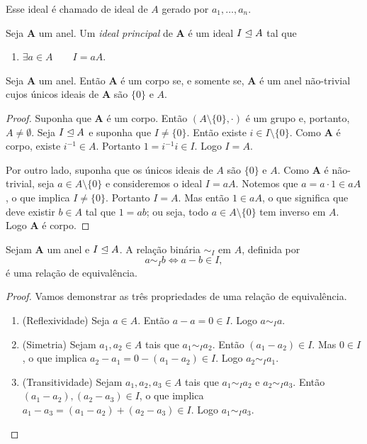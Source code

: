 	Esse ideal é chamado de ideal de $A$ gerado por $a_1,\ldots,a_n$.

\begin{defi}
	Seja $\bm A$ um anel. Um \emph{ideal principal} de $\bm A$ é um ideal $I \mathrel{\unlhd} A$ tal que
	\begin{enumerate}
	\item $\exists a \in A \qquad I=aA$.
	\end{enumerate}
\end{defi}

\begin{prop}
\label{pro:corp.sse.ide}
	Seja $\bm A$ um anel. Então $\bm A$ é um corpo se, e somente se, $\bm A$ é um anel não-trivial cujos únicos ideais de $\bm A$ são $\{0\}$ e $A$.
\end{prop}
\begin{proof}
	Suponha que $\bm A$ é um corpo. Então $(A\setminus\{0\},\cdot)$ é um grupo e, portanto, $A \neq \emptyset$. Seja $I \mathrel{\unlhd} A$ e suponha que $I \neq \{0\}$. Então existe $i \in I\setminus\{0\}$. Como $\bm A$ é corpo, existe $i^{-1} \in A$. Portanto $1=i^{-1}i \in I$. Logo $I=A$.

	Por outro lado, suponha que os únicos ideais de $A$ são $\{0\}$ e $A$. Como $\bm A$ é não-trivial, seja $a \in A\setminus\{0\}$ e consideremos o ideal $I=aA$. Notemos que $a=a \cdot 1 \in aA$, o que implica $I \neq \{0\}$. Portanto $I=A$. Mas então $1 \in aA$, o que significa que deve existir $b \in A$ tal que $1=ab$; ou seja, todo $a \in A\setminus\{0\}$ tem inverso em $A$. Logo $\bm A$ é corpo.
\end{proof}

\begin{prop}
	Sejam $\bm A$ um anel e $I \mathrel{\unlhd} A$. A relação binária $\sim_I$ em $A$, definida por
	\begin{equation*}
	a \sim_I b \Leftrightarrow a-b \in I,
	\end{equation*}
é uma relação de equivalência.
\end{prop}
\begin{proof} Vamos demonstrar as três propriedades de uma relação de equivalência.
	\begin{enumerate}
	\item (Reflexividade) Seja $a \in A$. Então $a-a=0 \in I$. Logo $a \sim_I a$.
	\item (Simetria) Sejam $a_1,a_2 \in A$ tais que $a_1 \sim_I a_2$. Então $(a_1-a_2) \in I$. Mas $0 \in I$, o que implica $a_2-a_1 = 0-(a_1-a_2) \in I$. Logo $a_2 \sim_I a_1$.
	\item (Transitividade) Sejam $a_1,a_2,a_3 \in A$ tais que $a_1 \sim_I a_2$ e $a_2 \sim_I a_3$. Então $(a_1-a_2),(a_2-a_3) \in I$, o que implica $a_1-a_3=(a_1-a_2)+(a_2-a_3) \in I$. Logo $a_1 \sim_I a_3$.
	\end{enumerate}
\end{proof}

